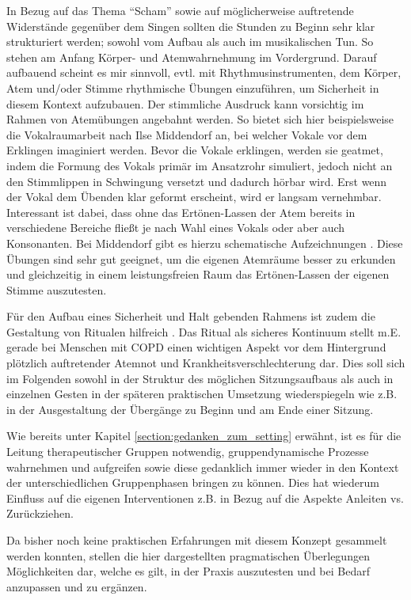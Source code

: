 In Bezug auf das Thema "`Scham"' sowie auf möglicherweise auftretende Widerstände gegenüber dem Singen sollten die Stunden zu Beginn sehr klar strukturiert werden; sowohl vom Aufbau als auch im musikalischen Tun. So stehen am Anfang Körper- und Atemwahrnehmung im Vordergrund. Darauf aufbauend scheint es mir sinnvoll, evtl. mit Rhythmusinstrumenten, dem Körper, Atem und/oder Stimme rhythmische Übungen einzuführen, um Sicherheit in diesem Kontext aufzubauen. Der stimmliche Ausdruck kann vorsichtig im Rahmen von Atemübungen angebahnt werden. So bietet sich hier beispielsweise die Vokalraumarbeit nach Ilse Middendorf an, bei welcher Vokale vor dem Erklingen imaginiert werden. Bevor die Vokale erklingen, werden sie geatmet, indem die Formung des Vokals primär im Ansatzrohr simuliert, jedoch nicht an den Stimmlippen in Schwingung versetzt und dadurch hörbar wird. Erst wenn der Vokal dem Übenden klar geformt erscheint, wird er langsam vernehmbar. Interessant ist dabei, dass ohne das Ertönen-Lassen der Atem bereits in verschiedene Bereiche fließt je nach Wahl eines Vokals oder aber auch Konsonanten. Bei Middendorf gibt es hierzu schematische Aufzeichnungen \autocite[vgl.][60ff.]{middendorf1995}. Diese Übungen sind sehr gut geeignet, um die eigenen Atemräume besser zu erkunden und gleichzeitig in einem leistungsfreien Raum das Ertönen-Lassen der eigenen Stimme auszutesten. 

Für den Aufbau eines Sicherheit und Halt gebenden Rahmens ist zudem die Gestaltung von Ritualen hilfreich \autocite[vgl.][31ff.]{deckervoigt2013}. Das Ritual als sicheres Kontinuum stellt m.E. gerade bei Menschen mit COPD einen wichtigen Aspekt vor dem Hintergrund plötzlich auftretender Atemnot und Krankheitsverschlechterung dar. Dies soll sich im Folgenden sowohl in der Struktur des möglichen Sitzungsaufbaus als auch in einzelnen Gesten in der späteren praktischen Umsetzung wiederspiegeln wie z.B. in der Ausgestaltung der Übergänge zu Beginn und am Ende einer Sitzung.

Wie bereits unter Kapitel \ref{section:gedanken_zum_setting} erwähnt, ist es für die Leitung therapeutischer Gruppen notwendig, gruppendynamische Prozesse wahrnehmen und aufgreifen sowie diese gedanklich immer wieder in den Kontext der unterschiedlichen Gruppenphasen bringen zu können. Dies hat wiederum Einfluss auf die eigenen Interventionen z.B. in Bezug auf die Aspekte Anleiten vs. Zurückziehen.

Da bisher noch keine praktischen Erfahrungen mit diesem Konzept gesammelt werden konnten, stellen die hier dargestellten pragmatischen Überlegungen Möglichkeiten dar, welche es gilt, in der Praxis auszutesten und bei Bedarf anzupassen und zu ergänzen. 

